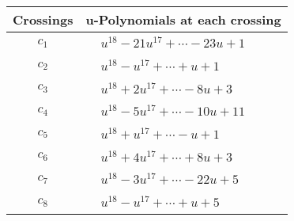 \documentclass[1p]{elsarticle_modified}
\theoremstyle{definition}
\begin{document}
\begin{tabular}{m{50pt}|m{274pt}}
Crossings & \hspace{64pt}u-Polynomials at each crossing \\
\hline $$\begin{aligned}c_{1}\end{aligned}$$&$\begin{aligned}
&u^{18}-21 u^{17}+\cdots-23 u+1
\end{aligned}$\\
\hline $$\begin{aligned}c_{2}\end{aligned}$$&$\begin{aligned}
&u^{18}- u^{17}+\cdots+u+1
\end{aligned}$\\
\hline $$\begin{aligned}c_{3}\end{aligned}$$&$\begin{aligned}
&u^{18}+2 u^{17}+\cdots-8 u+3
\end{aligned}$\\
\hline $$\begin{aligned}c_{4}\end{aligned}$$&$\begin{aligned}
&u^{18}-5 u^{17}+\cdots-10 u+11
\end{aligned}$\\
\hline $$\begin{aligned}c_{5}\end{aligned}$$&$\begin{aligned}
&u^{18}+u^{17}+\cdots- u+1
\end{aligned}$\\
\hline $$\begin{aligned}c_{6}\end{aligned}$$&$\begin{aligned}
&u^{18}+4 u^{17}+\cdots+8 u+3
\end{aligned}$\\
\hline $$\begin{aligned}c_{7}\end{aligned}$$&$\begin{aligned}
&u^{18}-3 u^{17}+\cdots-22 u+5
\end{aligned}$\\
\hline $$\begin{aligned}c_{8}\end{aligned}$$&$\begin{aligned}
&u^{18}- u^{17}+\cdots+u+5
\end{aligned}$\\

\end{tabular}
\end{document}
